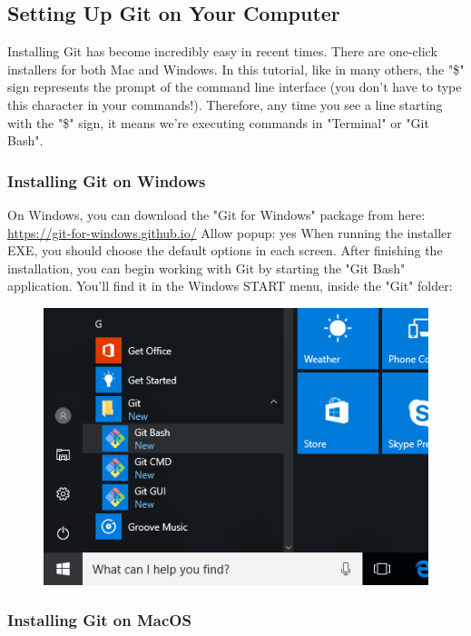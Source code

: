\documentclass{article}
\begin{document}
\subsection{Setting Up Git on Your Computer}
Installing Git has become incredibly easy in recent times. There are one-click installers for both Mac and Windows.
\newline\newline
In this tutorial, like in many others, the "\$" sign represents the prompt of the command line interface (you don't have to type this character in your commands!). Therefore, any time you see a line starting with the "\$" sign, it means we're executing commands in "Terminal" or "Git Bash".


\subsubsection{Installing Git on Windows}
On Windows, you can download the "Git for Windows" package from here: \href{https://git-for-windows.github.io/}{ https://git-for-windows.github.io/}  
Allow popup: yes
\newline\newline
When running the installer EXE, you should choose the default options in each screen. After finishing the installation, you can begin working with Git by starting the "Git Bash" application. You'll find it in the Windows START menu, inside the "Git" folder:
\begin{figure}[h]
    \centering
    \includegraphics[width=4.5in]{images/git-bash-windows}
\end{figure}

\subsubsection{Installing Git on MacOS}
\end{document}
